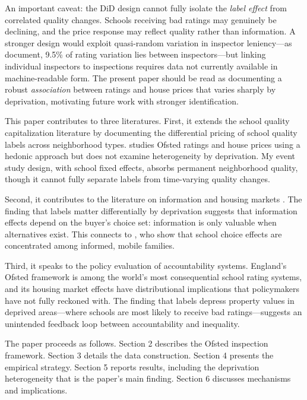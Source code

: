 \documentclass[12pt]{article}
\begin{document}
An important caveat: the DiD design cannot fully isolate the \textit{label effect} from correlated quality changes. Schools receiving bad ratings may genuinely be declining, and the price response may reflect quality rather than information. A stronger design would exploit quasi-random variation in inspector leniency---as \citet{bokhove2023inspector} document, 9.5\% of rating variation lies between inspectors---but linking individual inspectors to inspections requires data not currently available in machine-readable form. The present paper should be read as documenting a robust \textit{association} between ratings and house prices that varies sharply by deprivation, motivating future work with stronger identification.

This paper contributes to three literatures. First, it extends the school quality capitalization literature \citep{black1999better, gibbons2013valuing, bayer2007unified, kane2006housing, machin2011supply, fack2006deux} by documenting the differential pricing of school quality labels across neighborhood types. \citet{hussain2016housing} studies Ofsted ratings and house prices using a hedonic approach but does not examine heterogeneity by deprivation. My event study design, with school fixed effects, absorbs permanent neighborhood quality, though it cannot fully separate labels from time-varying quality changes.

Second, it contributes to the literature on information and housing markets \citep{pope2015price, figlio2004can, cellini2010value}. The finding that labels matter differentially by deprivation suggests that information effects depend on the buyer's choice set: information is only valuable when alternatives exist. This connects to \citet{hastings2009heterogeneous}, who show that school choice effects are concentrated among informed, mobile families.

Third, it speaks to the policy evaluation of accountability systems. England's Ofsted framework is among the world's most consequential school rating systems, and its housing market effects have distributional implications that policymakers have not fully reckoned with. The finding that labels depress property values in deprived areas---where schools are most likely to receive bad ratings---suggests an unintended feedback loop between accountability and inequality.

The paper proceeds as follows. Section 2 describes the Ofsted inspection framework. Section 3 details the data construction. Section 4 presents the empirical strategy. Section 5 reports results, including the deprivation heterogeneity that is the paper's main finding. Section 6 discusses mechanisms and implications.
\end{document}
